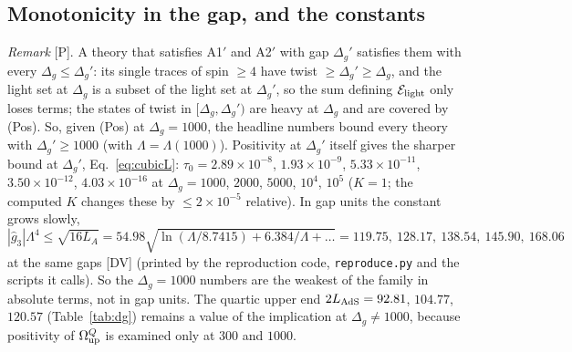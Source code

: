 \documentclass[aps,prl,onecolumn,superscriptaddress,nofootinbib]{revtex4-2}
\begin{document}
\subsection{Monotonicity in the gap, and the constants}
\emph{Remark} [P]. A theory that satisfies A1$'$ and A2$'$ with gap $\Delta_g'$ satisfies them with every $\Delta_g\le\Delta_g'$:
its single traces of spin $\ge4$ have twist $\ge\Delta_g'\ge\Delta_g$, and the light set at $\Delta_g$ is a subset of the light set
at $\Delta_g'$, so the sum defining $\mathcal E_{\rm light}$ only loses terms; the states of twist in $[\Delta_g,\Delta_g')$ are heavy
at $\Delta_g$ and are covered by (Pos). So, given (Pos) at $\Delta_g=1000$, the headline numbers bound every theory with
$\Delta_g'\ge1000$ (with $\Lambda=\Lambda(1000)$). Positivity at $\Delta_g'$ itself gives the sharper bound at $\Delta_g'$,
Eq.~\eqref{eq:cubicL}: $\tau_0=2.89\times10^{-8}$, $1.93\times10^{-9}$, $5.33\times10^{-11}$, $3.50\times10^{-12}$,
$4.03\times10^{-16}$ at $\Delta_g=1000$, $2000$, $5000$, $10^4$, $10^5$ ($K=1$; the computed $K$ changes these by $\le2\times10^{-5}$ relative). In gap units the constant grows slowly,
\begin{equation}
|\hat g_3|\Lambda^4\le\sqrt{16L_A}=54.98\sqrt{\ln(\Lambda/8.7415)+6.384/\Lambda+\dots}
=119.75,\ 128.17,\ 138.54,\ 145.90,\ 168.06
\label{eq:g3gap}
\end{equation}
at the same gaps [DV] (printed by the reproduction code, \texttt{reproduce.py} and the scripts it calls). So the $\Delta_g=1000$ numbers are the weakest of the family in
absolute terms, not in gap units. The quartic upper end $2L_{\rm AdS}=92.81$, $104.77$, $120.57$ (Table~\ref{tab:dg}) remains a
value of the implication at $\Delta_g\ne1000$, because positivity of $\Omega^Q_{\rm up}$ is examined only at $300$ and $1000$.
\end{document}
